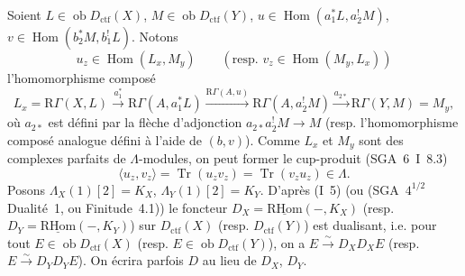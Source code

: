 \documentclass[11pt]{article}
\DeclareMathOperator{\Hom}{Hom}
\newcommand{\R}{\mathrm{R}}\newcommand{\RHomCore}{\mathrm{RHom}}
\newcommand{\ob}{\operatorname{ob}}
\providecommand{\RHom}{\RHomCore}
\providecommand{\uRHom}{\underline{\RHom}}
\providecommand{\ctf}{\mathrm{ctf}}
\providecommand{\Tr}{\operatorname{Tr}}
\providecommand{\Tr}{\operatorname{Tr}}
\providecommand{\Tr}{\operatorname{Tr}}
\providecommand{\RHom}{\RHomCore}
\providecommand{\Hom}{\operatorname{Hom}}
\providecommand{\ob}{\operatorname{ob}}
\providecommand{\RHom}{\R\mathcal{H}om}
\providecommand{\R}{\mathrm R}
\providecommand{\Tr}{\operatorname{Tr}}
\providecommand{\RHom}{\RHomCore}
\providecommand{\Hom}{\operatorname{Hom}}
\providecommand{\Tr}{\operatorname{Tr}}
\begin{document}
Soient $L\in \ob D_{\ctf}(X)$, $M\in \ob D_{\ctf}(Y)$, $u\in\Hom(a_1^*L,a_2^!M)$, $v\in\Hom(b_2^*M,b_1^!L)$. Notons
\[
u_z\in\Hom(L_x,M_y)\qquad (\text{resp. }v_z\in\Hom(M_y,L_x))
\]
l'homomorphisme composé
\[
L_x=\R\Gamma(X,L)\xrightarrow{a_1^*}\R\Gamma(A,a_1^*L)
\xrightarrow{\R\Gamma(A,u)}\R\Gamma(A,a_2^!M)
\xrightarrow{a_{2*}}\R\Gamma(Y,M)=M_y,
\]
où $a_{2*}$ est défini par la flèche d'adjonction $a_{2*}a_2^!M\to M$ (resp. l'homomorphisme composé analogue défini à l'aide de $(b,v)$). Comme $L_x$ et $M_y$ sont des complexes parfaits de $\Lambda$-modules, on peut former le cup-produit (SGA~6~I~8.3)
\begin{equation}\tag{1.1.1}
\langle u_z,v_z\rangle=\Tr(u_zv_z)=\Tr(v_zu_z)\in\Lambda.
\end{equation}
Posons $\Lambda_X(1)[2]=K_X$, $\Lambda_Y(1)[2]=K_Y$. D'après (I~5) (ou (SGA~$4^{1/2}$ Dualité~1, ou Finitude~4.1)) le foncteur $D_X=\uRHom(-,K_X)$ (resp. $D_Y=\uRHom(-,K_Y)$) sur $D_{\ctf}(X)$ (resp. $D_{\ctf}(Y)$) est dualisant, i.e. pour tout $E\in\ob D_{\ctf}(X)$ (resp. $E\in\ob D_{\ctf}(Y)$), on a $E\xrightarrow{\sim}D_XD_XE$ (resp. $E\xrightarrow{\sim}D_YD_YE$). On écrira parfois $D$ au lieu de $D_X$, $D_Y$.
\end{document}
